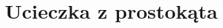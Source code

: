 \documentclass[aspectratio=169]{beamer}
\begin{document}
\begin{frame}
\begin{figure}
  	{\escapeFromCircleConvPlotTex}
\end{figure}
\end{frame}

\begin{frame}
\begin{columns}
\begin{column}{0.5\textwidth}
  \begin{figure}
    	{\escapeFromCircleLogoFixedTex}
  \end{figure}
\end{column}
\begin{column}{0.5\textwidth}
  \begin{figure}
    	{\escapeFromCircleAzimuthFixedTex}
  \end{figure}
\end{column}
\end{columns}
\end{frame}

\begin{frame}
\begin{figure}
  	{\escapeFromCircleConvPlotFixedTex}
\end{figure}
\end{frame}

\section{Ucieczka z prostokąta}

\begin{frame}
\begin{figure}
  	{\escapeFromRectangleExTex}
\end{figure}
\end{frame}

\begin{frame}
\begin{columns}
\begin{column}{0.5\textwidth}
  \begin{figure}
    	{\escapeFromRectangleLogoTex}
  \end{figure}
\end{column}
\begin{column}{0.5\textwidth}
  \begin{figure}
    	{\escapeFromRectangleAzimuthTex}
  \end{figure}
\end{column}
\end{columns}
\end{frame}
\end{document}
